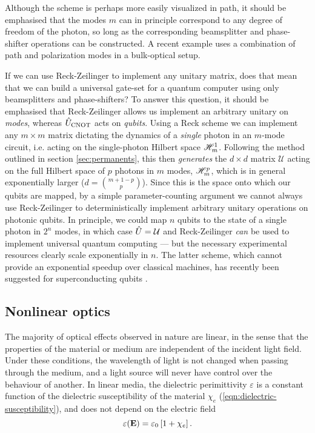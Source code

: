Although the scheme is perhaps more easily visualized in path, it should be emphasised that the modes $m$ can in principle correspond to any degree of freedom of the photon, so long as the corresponding beamsplitter and phase-shifter operations can be constructed. A recent example \cite{Russell} uses a combination of path and polarization modes in a bulk-optical setup.

If we can use Reck-Zeilinger to implement any unitary matrix, does that mean that we can build a universal gate-set for a quantum computer using only beamsplitters and phase-shifters? To answer this question, it should be emphasised that Reck-Zeilinger allows us implement an arbitrary unitary on \emph{modes}, whereas $\hat{U}_\mathrm{CNOT}$ acts on \emph{qubits}. Using a Reck scheme we can implement any $m \times m$ matrix dictating the dynamics of a \emph{single} photon in an $m$-mode circuit, i.e. acting on the single-photon Hilbert space $\mathscr{H}_m^{1}$. Following the method outlined in section \ref{sec:permanents}, this then \emph{generates} the $d\times d$ matrix $\mathcal{U}$ acting on the full Hilbert space of $p$ photons in $m$ modes, $\mathscr{H}_m^p$, which is in general exponentially larger ($d = \binom{m+1-p}{p}$). Since this is the space onto which our qubits are mapped, by a simple parameter-counting argument we cannot always use Reck-Zeilinger to deterministically implement arbitrary unitary operations on photonic qubits. In principle, we could map $n$ qubits to the state of a single photon in $2^n$ modes, in which case $\hat{U}=\mathcal{U}$ and Reck-Zeilinger \emph{can} be used to implement universal quantum computing --- but the necessary experimental resources clearly scale exponentially in $n$. The latter scheme, which cannot provide an exponential speedup over classical machines, has recently been suggested for superconducting qubits \cite{Geller2012}.



\subsection{Nonlinear optics}
\label{sec:nonlinear-optics}
The majority of optical effects observed in nature are linear, in the sense that the properties of the material or medium are independent of the incident light field.  
%
%
Under these conditions, the wavelength of light is not changed when passing through the medium, and a light source will never have control over the behaviour of another. 
In linear media, the dielectric perimittivity $\varepsilon$ is a constant function of the dielectric susceptibility of the material $\chi_e$ (\ref{eqn:dielectric-susceptibility}), and does not depend on the electric field
\begin{equation}
    \varepsilon(\mathbf{E}) = \varepsilon_0\left[1+\chi_e\right].
\end{equation}

